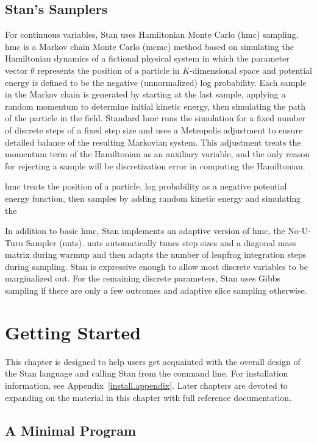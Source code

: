 \documentclass[10pt]{report}
\newcommand{\Stan}{Stan\xspace}
\newcommand{\acronym}[1]{{\sc #1}\xspace}
\newcommand{\MCMC}{\acronym{mcmc}}
\newcommand{\HMC}{\acronym{hmc}}
\newcommand{\NUTS}{\acronym{nuts}}
\newcommand{\refappendix}[1]{Appendix~\ref{#1.appendix}}
\begin{document}
\section{\Stan's Samplers}

For continuous variables, Stan uses Hamiltonian Monte Carlo (\HMC)
sampling. \HMC is a Markov chain Monte Carlo (\MCMC) method based on
simulating the Hamiltonian dynamics of a fictional physical system in
which the parameter vector $\theta$ represents the position of a
particle in $K$-dimensional space and potential energy is defined to
be the negative (unnormalized) log probability.  Each sample in the
Markov chain is generated by starting at the last sample, applying a
random momentum to determine initial kinetic energy, then simulating
the path of the particle in the field.  Standard \HMC runs the
simulation for a fixed number of discrete steps of a fixed step size
and uses a Metropolis adjustment to ensure detailed balance of the
resulting Markovian system.  This adjustment treats the momentum term
of the Hamiltonian as an auxiliary variable, and the only reason for
rejecting a sample will be discretization error in computing the
Hamiltonian.

\HMC treats the position of a particle, 
log probability as a negative potential
energy function, then samples by adding random kinetic energy and
simulating the 

In addition to basic \HMC, Stan implements an adaptive
version of \HMC, the No-U-Turn Sampler (\NUTS).  \NUTS automatically
tunes step sizes and a diagonal mass matrix during warmup and then
adapts the number of leapfrog integration steps during sampling.
Stan is expressive enough to allow most discrete variables to be
marginalized out.  For the remaining discrete parameters, Stan uses
Gibbs sampling if there are only a few outcomes and adaptive slice
sampling otherwise.


\chapter{Getting Started}

This chapter is designed to help users get acquainted with the overall
design of the \Stan language and calling \Stan from the command line.
For installation information, see \refappendix{install}.
Later chapters are devoted to expanding on the material in this
chapter with full reference documentation.


\section{A Minimal Program}
\end{document}
